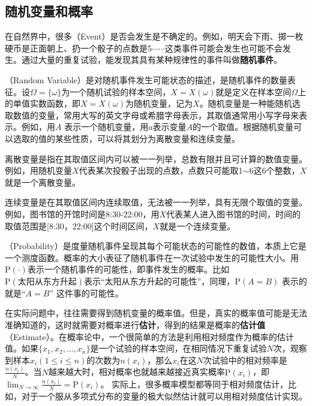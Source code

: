 
\subsection{随机变量和概率}
\parinterval 在自然界中，很多{\small{}}（Event）是否会发生是不确定的。例如，明天会下雨、掷一枚硬币是正面朝上、扔一个骰子的点数是5$\cdots\cdots$这类事件可能会发生也可能不会发生。通过大量的重复试验，能发现其具有某种规律性的事件叫做{\small\sffamily\bfseries{随机事件}}。

（Random Variable）是对随机事件发生可能状态的描述，是随机事件的数量表征。设$\Omega = \{ \omega \}$为一个随机试验的样本空间，$X=X(\omega)$就是定义在样本空间$\Omega$上的单值实数函数，即$X=X(\omega)$为随机变量，记为$X$。随机变量是一种能随机选取数值的变量，常用大写的英文字母或希腊字母表示，其取值通常用小写字母来表示。例如，用$A$ 表示一个随机变量，用$a$表示变量$A$的一个取值。根据随机变量可以选取的值的某些性质，可以将其划分为离散变量和连续变量。

\parinterval 离散变量是指在其取值区间内可以被一一列举，总数有限并且可计算的数值变量。例如，用随机变量$X$代表某次投骰子出现的点数，点数只可能取1$\sim$6这6个整数，$X$就是一个离散变量。

\parinterval 连续变量是在其取值区间内连续取值，无法被一一列举，具有无限个取值的变量。例如，图书馆的开馆时间是8:30-22:00，用$X$代表某人进入图书馆的时间，时间的取值范围是[8:30，22:00]这个时间区间，$X$就是一个连续变量。

（Probability）是度量随机事件呈现其每个可能状态的可能性的数值，本质上它是一个测度函数\cite{mao-prob-book-2011}\cite{kolmogorov2018foundations}。概率的大小表征了随机事件在一次试验中发生的可能性大小。用$\textrm{P}(\cdot )$表示一个随机事件的可能性，即事件发生的概率。比如$\textrm{P}(\textrm{太阳从东方升起})$表示``太阳从东方升起的可能性''，同理，$\textrm{P}(A=B)$ 表示的就是``$A=B$'' 这件事的可能性。

\parinterval 在实际问题中，往往需要得到随机变量的概率值。但是，真实的概率值可能是无法准确知道的，这时就需要对概率进行{\small\sffamily\bfseries{估计}}，得到的结果是概率的{\small\sffamily\bfseries{估计值}}（Estimate）。在概率论中，一个很简单的方法是利用相对频度作为概率的估计值。如果$\{x_1,x_2,\dots,x_n \}$是一个试验的样本空间，在相同情况下重复试验$N$次，观察到样本$x_i (1\leq{i}\leq{n})$的次数为$n (x_i )$，那么$x_i$在这$N$次试验中的相对频率是$\frac{n(x_i )}{N}$。当$N$越来越大时，相对概率也就越来越接近真实概率$\textrm{P}(x_i)$，即$\lim_{N \to \infty}\frac{n(x_i )}{N}=\textrm{P}(x_i)$。 实际上，很多概率模型都等同于相对频度估计，比如，对于一个服从多项式分布的变量的极大似然估计就可以用相对频度估计实现。


